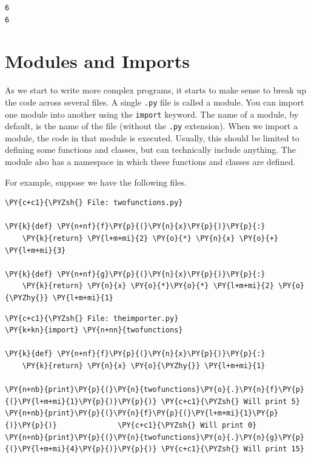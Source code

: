 \begin{Verbatim}
6
6
\end{Verbatim}

\section{Modules and Imports}


As we start to write more complex programs, it starts to make sense to break up the code across several files.  A single \texttt{.py} file is called a module.  You can import one module into another using the \texttt{import} keyword.  The name of a module, by default, is the name of the file (without the \texttt{.py} extension).  When we import a module, the code in that module is executed.  Usually, this should be limited to defining some functions and classes, but can technically include anything.  The module also has a namespace in which these functions and classes are defined.


For example, suppose we have the following files.

\begin{Verbatim}[commandchars=\\\{\}]
\PY{c+c1}{\PYZsh{} File: twofunctions.py}

\PY{k}{def} \PY{n+nf}{f}\PY{p}{(}\PY{n}{x}\PY{p}{)}\PY{p}{:}
    \PY{k}{return} \PY{l+m+mi}{2} \PY{o}{*} \PY{n}{x} \PY{o}{+} \PY{l+m+mi}{3}

\PY{k}{def} \PY{n+nf}{g}\PY{p}{(}\PY{n}{x}\PY{p}{)}\PY{p}{:}
    \PY{k}{return} \PY{n}{x} \PY{o}{*}\PY{o}{*} \PY{l+m+mi}{2} \PY{o}{\PYZhy{}} \PY{l+m+mi}{1}
\end{Verbatim}


\begin{Verbatim}[commandchars=\\\{\}]
\PY{c+c1}{\PYZsh{} File: theimporter.py}
\PY{k+kn}{import} \PY{n+nn}{twofunctions}

\PY{k}{def} \PY{n+nf}{f}\PY{p}{(}\PY{n}{x}\PY{p}{)}\PY{p}{:}
    \PY{k}{return} \PY{n}{x} \PY{o}{\PYZhy{}} \PY{l+m+mi}{1}

\PY{n+nb}{print}\PY{p}{(}\PY{n}{twofunctions}\PY{o}{.}\PY{n}{f}\PY{p}{(}\PY{l+m+mi}{1}\PY{p}{)}\PY{p}{)} \PY{c+c1}{\PYZsh{} Will print 5}
\PY{n+nb}{print}\PY{p}{(}\PY{n}{f}\PY{p}{(}\PY{l+m+mi}{1}\PY{p}{)}\PY{p}{)}              \PY{c+c1}{\PYZsh{} Will print 0}
\PY{n+nb}{print}\PY{p}{(}\PY{n}{twofunctions}\PY{o}{.}\PY{n}{g}\PY{p}{(}\PY{l+m+mi}{4}\PY{p}{)}\PY{p}{)} \PY{c+c1}{\PYZsh{} Will print 15}
\end{Verbatim}



